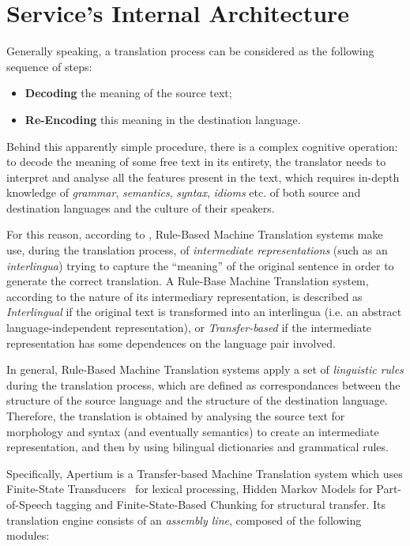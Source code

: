 \documentclass[11pt]{article}
\begin{document}
\section{Service's Internal Architecture}

Generally speaking, a translation process can be considered as the following sequence of steps:

\begin{itemize}
 \item {\bf Decoding} the meaning of the source text;
 \item {\bf Re-Encoding} this meaning in the destination language.
\end{itemize}

Behind this apparently simple procedure, there is a complex cognitive operation: to decode the meaning of some free text in its entirety, the translator needs to interpret and analyse all the features present in the text, which requires in-depth knowledge of \emph{grammar}, \emph{semantics}, \emph{syntax}, \emph{idioms} etc. of both source and destination languages and the culture of their speakers.

For this reason, according to \cite{arnoldea}, Rule-Based Machine Translation systems make use, during the translation process, of \emph{intermediate representations} (such as an \emph{interlingua}) trying to capture the ``meaning'' of the original sentence in order to generate the  correct translation. A Rule-Base Machine Translation system, according to the nature of its intermediary representation, is described as \emph{Interlingual} if the original text is transformed into an interlingua (i.e. an abstract language-independent representation), or \emph{Transfer-based} if the intermediate representation has some dependences on the language pair involved.

In general, Rule-Based Machine Translation systems apply a set of \emph{linguistic rules} during the translation process, which are defined as correspondances between the structure of the source language and the structure of the destination language. Therefore, the translation is obtained by analysing the source text for morphology and syntax (and eventually semantics) to create an intermediate representation, and then by using bilingual dictionaries and grammatical rules.

Specifically, Apertium is a Transfer-based Machine Translation system which uses Finite-State Transducers~\citep{fst} for lexical processing, Hidden Markov Models for Part-of-Speech tagging and Finite-State-Based Chunking for structural transfer. Its translation engine consists of an \emph{assembly line}, composed of the following modules:
\end{document}
